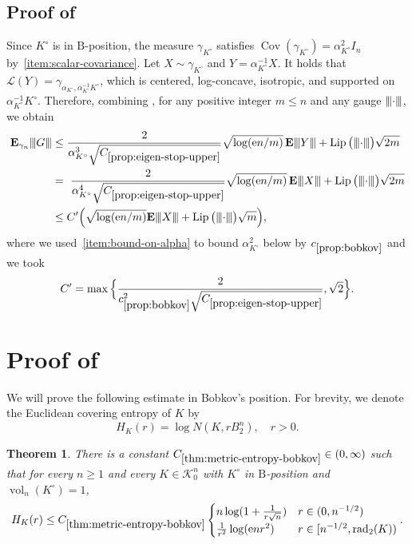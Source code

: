 \documentclass[11pt]{amsart}
\newcommand{\E}{\mathbf E}
\newcommand{\Vol}{\operatorname{vol}}
\newcommand{\rad}{\operatorname{rad}_2}
\newcommand{\Cov}{\operatorname{Cov}}
\newcommand{\Lip}{\operatorname{Lip}}
\newcommand{\1}{\mathbf 1}
\newcommand{\vertiii}[1]{{\left\vert\kern-0.25ex\left\vert\kern-0.25ex\left\vert #1 
\right\vert\kern-0.25ex\right\vert\kern-0.25ex\right\vert}}
\newcommand{\gauge}[1]{\vertiii{#1}}
\newcommand{\e}{\mathrm{e}}
\newcommand{\Bodies}{\mathcal{K}_0^n}
\newcommand{\Bobkov}{\mathrm{B}}
\newcommand{\cL}{\mathcal{L}}
\let\vol\Vol
\theoremstyle{plain}
\newtheorem{theorem}{Theorem}[section]
\begin{document}
\subsection{Proof of~\texorpdfstring{}{the comparison theorem}}
Since $K^\circ$ is in $\Bobkov$-position, the measure $\gamma_{K^\circ}$ satisfies $\Cov(\gamma_{K^\circ}) = \alpha_{K^\circ}^2 I_n$ by~\ref{item:scalar-covariance}. Let $X \sim \gamma_{K^\circ}$ and $Y = \alpha_{K^\circ}^{-1} X$. It holds that $\cL(Y) = \gamma_{\alpha_{K^\circ}, \alpha_{K^\circ}^{-1} K^\circ}$, which is centered, log-concave, isotropic, and supported on $\alpha_{K^\circ}^{-1} K^\circ$. Therefore, combining , for any positive integer $m \leq n$ and any gauge $\gauge{\cdot}$, we obtain
\begin{align}
\E_{\gamma_n} \gauge{G} &\leq \frac{2}{\alpha_{K^\circ}^3 \sqrt{C_{\ref{prop:eigen-stop-upper}}}} \sqrt{\log(\e n/m)}\,  \E \gauge{Y} + \Lip\big(\gauge{\cdot}\big) \sqrt{2m} \nonumber  \\ 
&= \ \frac{2}{\alpha_{K^\circ}^4\sqrt{C_{\ref{prop:eigen-stop-upper}}}} \sqrt{\log(\e n/m)}\,  \E \gauge{X} + \Lip\big(\gauge{\cdot}\big) \sqrt{2m}  \nonumber \\ 
&\leq C' \Big(\sqrt{\log(\e n/m)} \E \gauge{X}  + \Lip\big(\gauge{\cdot}\big) \sqrt{m} \Big),
\label{ineq:m-final-bound-first}
\end{align}
where we used~\ref{item:bound-on-alpha} to bound $\alpha_{K^\circ}^2$ below by $c_{\ref{prop:bobkov}}$ and we took
\[
C' = \max\Big\{\frac{2}{c_{\ref{prop:bobkov}}^2\sqrt{C_{\ref{prop:eigen-stop-upper}}}}, \sqrt{2}\Big\}. 
\]


\section{Proof of~\texorpdfstring{}{the covering-number theorem}}

We will prove the following estimate in Bobkov's position. For brevity, we denote the Euclidean covering entropy of $K$ by
\[
H_K(r) = \log N(K, r B^n_2), \quad r > 0.
\]
\begin{theorem}
\label{thm:metric-entropy-bobkov}
There is a constant $C_{\ref{thm:metric-entropy-bobkov}} \in (0, \infty)$ such that for every $n \geq 1$ and every $K \in \Bodies$ with $K^\circ$ in $\Bobkov$-position and $\vol_n(K^\circ) = 1$,
\[
H_K(r) \leq C_{\ref{thm:metric-entropy-bobkov}}\begin{cases}
  n \log(1 + \tfrac{1}{r\sqrt{n}}) & r \in (0, n^{-1/2}) \\ 
 \tfrac{1}{r^2} \log(\e n r^2) & r \in [n^{-1/2}, \rad(K))  
 \end{cases}.
\]
\end{theorem}
\end{document}
